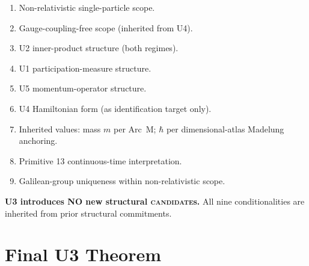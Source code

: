 \documentclass[11pt,a4paper]{article}
\begin{document}
\begin{enumerate}
  \item Non-relativistic single-particle scope.
  \item Gauge-coupling-free scope (inherited from U4).
  \item U2 inner-product structure (both regimes).
  \item U1 participation-measure structure.
  \item U5 momentum-operator structure.
  \item U4 Hamiltonian form (as identification target only).
  \item Inherited values: mass $m$ per Arc~M; $\hbar$ per dimensional-atlas Madelung anchoring.
  \item Primitive 13 continuous-time interpretation.
  \item Galilean-group uniqueness within non-relativistic scope.
\end{enumerate}

\textbf{U3 introduces NO new structural \textsc{candidate}s.} All nine conditionalities are inherited from prior structural commitments.

\section{Final U3 Theorem}\label{sec:final-theorem}
\end{document}
